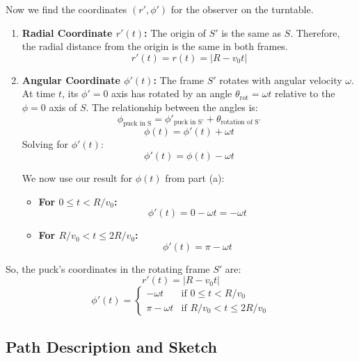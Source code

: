 \documentclass[11pt, a4paper]{article} %
\begin{document}
Now we find the coordinates $(r', \phi')$ for the observer on the turntable.

\begin{enumerate}
    \item \textbf{Radial Coordinate $r'(t)$:}
    The origin of $S'$ is the same as $S$. Therefore, the radial distance from the origin is the same in both frames.
    $$r'(t) = r(t) = |R - v_0 t|$$

    \item \textbf{Angular Coordinate $\phi'(t)$:}
    The frame $S'$ rotates with angular velocity $\omega$. At time $t$, its $\phi'=0$ axis has rotated by an angle $\theta_{\text{rot}} = \omega t$ relative to the $\phi=0$ axis of $S$.
    The relationship between the angles is:
    $$\phi_{\text{puck in S}} = \phi'_{\text{puck in S'}} + \theta_{\text{rotation of S'}}$$
    $$\phi(t) = \phi'(t) + \omega t$$
    Solving for $\phi'(t)$:
    $$\phi'(t) = \phi(t) - \omega t$$
    
    We now use our result for $\phi(t)$ from part (a):
    \begin{itemize}
        \item \textbf{For $0 \le t < R/v_0$:}
        $$\phi'(t) = 0 - \omega t = -\omega t$$
        \item \textbf{For $R/v_0 < t \le 2R/v_0$:}
        $$\phi'(t) = \pi - \omega t$$
    \end{itemize}
\end{enumerate}

So, the puck's coordinates in the rotating frame $S'$ are:
$$r'(t) = |R - v_0 t|$$
$$\phi'(t) = \begin{cases} -\omega t & \text{if } 0 \le t < R/v_0 \\ \pi - \omega t & \text{if } R/v_0 < t \le 2R/v_0 \end{cases}$$

\hrulefill

\subsection*{Path Description and Sketch}
\end{document}
